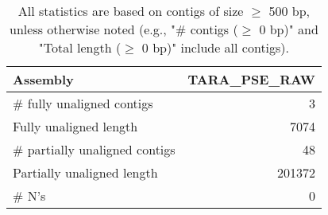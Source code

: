 \documentclass[12pt,a4paper]{article}
\begin{document}
\begin{table}[ht]
\begin{center}
\caption{All statistics are based on contigs of size $\geq$ 500 bp, unless otherwise noted (e.g., "\# contigs ($\geq$ 0 bp)" and "Total length ($\geq$ 0 bp)" include all contigs).}
\begin{tabular}{|l*{1}{|r}|}
\hline
Assembly & TARA\_PSE\_RAW \\ \hline
\# fully unaligned contigs & 3 \\ \hline
Fully unaligned length & 7074 \\ \hline
\# partially unaligned contigs & 48 \\ \hline
Partially unaligned length & 201372 \\ \hline
\# N's & 0 \\ \hline
\end{tabular}
\end{center}
\end{table}
\end{document}
